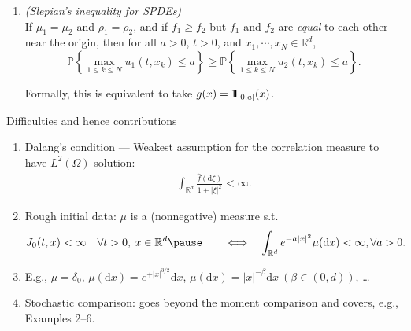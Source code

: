 \documentclass[9pt,table,xcolor=dvipsnames]{beamer}%
\newcommand{\ud}{\ensuremath{\mathrm{d} }}
\newcommand{\bbP}{\mathbb{P}}
\newcommand*{\one}{{ {\rm 1\mkern-1.5mu}\!{\rm I} }}
\newcommand{\R}{\mathbb{R}}
\theoremstyle{definition}
\theoremstyle{plain}
\begin{document}
\begin{frame}
\begin{enumerate}
  \item[Eg. 6~] \textcolor{yellow!75!black}{\it (Slepian's inequality for SPDEs)} \\[0.5em]
    If $\mu_1=\mu_2$ and $\rho_1=\rho_2$, and if $f_1\ge f_2$ but $f_1$ and $f_2$ are {\it equal} to each other near the origin, then for all $a>0$, $t>0$, and $x_1,\cdots, x_N\in\R^d$, \\[1em]
    \[
    \bbP \left\{ \max_{1\leq k \leq N} u_1(t, x_k) \leq a  \right\} \geq \bbP \left\{ \max_{1\leq k \leq N} u_2(t, x_k) \leq a  \right\}.
    \]
    \vspace{2em}

    Formally, this is equivalent to take $g(x) = \one_{[0,a]}(x)$.
\end{enumerate}
\end{frame}
\begin{frame}{Difficulties  and hence contributions}
\begin{enumerate}
  \item \textcolor{yellow!75!black}{Dalang's condition} --- Weakest assumption for the correlation measure to have $L^2(\Omega)$ solution:
    \begin{align}
      \int_{\R^d}\frac{\widehat{f}(\ud \xi)}{1+|\xi|^2}<\infty. \tag{DL}
    \end{align}
    \vfill
  \item \textcolor{yellow!75!black}{Rough initial data}: $\mu$ is a (nonnegative) measure s.t.
    \[
      J_0(t,x)<\infty\quad \forall t>0,\:x\in\R^d
      \pause\qquad\Longleftrightarrow\quad
      \int_{\R^d}e^{-a|x|^2}\mu(\ud x)<\infty,\forall a>0.
    \]\pause
  \item[] E.g., \quad $\mu=\delta_0$, \quad $\mu(\ud x) = e^{+|x|^{3/2}}\ud x$, \quad $\mu(\ud x) = |x|^{-\beta}\ud x\: (\beta\in (0,d))$, \dots
    \vfill
  \item \textcolor{yellow!75!black}{Stochastic comparison}: goes beyond the moment comparison and covers, e.g., Examples 2--6.
\end{enumerate}
\end{frame}
\end{document}
